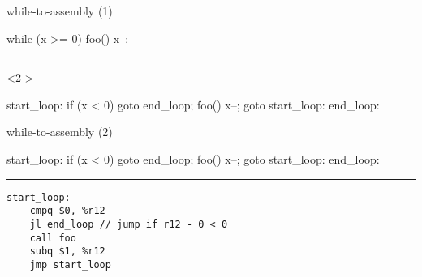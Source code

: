 \begin{frame}[fragile,label=loop3]{while-to-assembly (1)}
\begin{ccodeS}
while (x >= 0) {
    foo()
    x--;
} 
\end{ccodeS}
\hrule
\begin{visibleenv}<2->
\begin{ccodeS}
start_loop:
    if (x < 0) goto end_loop;
    foo()
    x--;
    goto start_loop:
end_loop:
\end{ccodeS}
\end{visibleenv}
\end{frame}

\begin{frame}[fragile,label=loop4]{while-to-assembly (2)}
\begin{ccodeS}
start_loop:
    if (x < 0) goto end_loop;
    foo()
    x--;
    goto start_loop:
end_loop:
\end{ccodeS}
\hrule
\begin{lstlisting}[language=myasm,style=small]
start_loop:
    cmpq $0, %r12 
    jl end_loop // jump if r12 - 0 < 0
    call foo
    subq $1, %r12
    jmp start_loop 
\end{lstlisting}
\end{frame}


